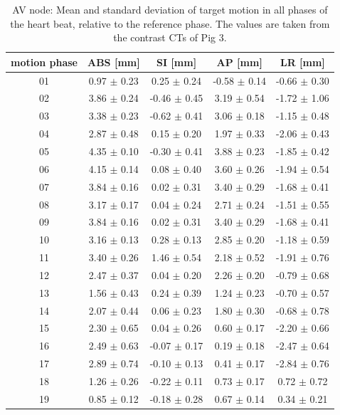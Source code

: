 \documentclass[type=dr, dr=rernat, accentcolor=tud7b,colorbacktitle, bigchapter, openright, twoside, 12pt ]{tudthesis}
\begin{document}
\newpage

\begin{table}[htbp]
  \centering
  \caption{AV node: Mean and standard deviation of target motion in all phases of the heart beat, relative to the reference phase. The values are 
  taken from the contrast CTs of Pig 3.}
  \begin{tabular}{|c|c|c|c|c|}
    \hline\hline
    motion phase\rule{0pt}{2.6ex}\rule[-1.2ex]{0pt}{0pt} & ABS [mm] & SI [mm] & AP [mm] & LR [mm]\\
    \hline
01 &0.97 $\pm$ 0.23 &0.25 $\pm$ 0.24 &-0.58 $\pm$ 0.14 &-0.66 $\pm$ 0.30 \\
02 &3.86 $\pm$ 0.24 &-0.46 $\pm$ 0.45 &3.19 $\pm$ 0.54 &-1.72 $\pm$ 1.06 \\
03 &3.38 $\pm$ 0.23 &-0.62 $\pm$ 0.41 &3.06 $\pm$ 0.18 &-1.15 $\pm$ 0.48 \\
04 &2.87 $\pm$ 0.48 &0.15 $\pm$ 0.20 &1.97 $\pm$ 0.33 &-2.06 $\pm$ 0.43 \\
05 &4.35 $\pm$ 0.10 &-0.30 $\pm$ 0.41 &3.88 $\pm$ 0.23 &-1.85 $\pm$ 0.42 \\
06 &4.15 $\pm$ 0.14 &0.08 $\pm$ 0.40 &3.60 $\pm$ 0.26 &-1.94 $\pm$ 0.54 \\
07 &3.84 $\pm$ 0.16 &0.02 $\pm$ 0.31 &3.40 $\pm$ 0.29 &-1.68 $\pm$ 0.41 \\
08 &3.17 $\pm$ 0.17 &0.04 $\pm$ 0.24 &2.71 $\pm$ 0.24 &-1.51 $\pm$ 0.55 \\
09 &3.84 $\pm$ 0.16 &0.02 $\pm$ 0.31 &3.40 $\pm$ 0.29 &-1.68 $\pm$ 0.41 \\
10 &3.16 $\pm$ 0.13 &0.28 $\pm$ 0.13 &2.85 $\pm$ 0.20 &-1.18 $\pm$ 0.59 \\
11 &3.40 $\pm$ 0.26 &1.46 $\pm$ 0.54 &2.18 $\pm$ 0.52 &-1.91 $\pm$ 0.76 \\
12 &2.47 $\pm$ 0.37 &0.04 $\pm$ 0.20 &2.26 $\pm$ 0.20 &-0.79 $\pm$ 0.68 \\
13 &1.56 $\pm$ 0.43 &0.24 $\pm$ 0.39 &1.24 $\pm$ 0.23 &-0.70 $\pm$ 0.57 \\
14 &2.07 $\pm$ 0.44 &0.06 $\pm$ 0.23 &1.80 $\pm$ 0.30 &-0.68 $\pm$ 0.78 \\
15 &2.30 $\pm$ 0.65 &0.04 $\pm$ 0.26 &0.60 $\pm$ 0.17 &-2.20 $\pm$ 0.66 \\
16 &2.49 $\pm$ 0.63 &-0.07 $\pm$ 0.17 &0.19 $\pm$ 0.18 &-2.47 $\pm$ 0.64 \\
17 &2.89 $\pm$ 0.74 &-0.10 $\pm$ 0.13 &0.41 $\pm$ 0.17 &-2.84 $\pm$ 0.76 \\
18 &1.26 $\pm$ 0.26 &-0.22 $\pm$ 0.11 &0.73 $\pm$ 0.17 &0.72 $\pm$ 0.72 \\
19 &0.85 $\pm$ 0.12 &-0.18 $\pm$ 0.28 &0.67 $\pm$ 0.14 &0.34 $\pm$ 0.21 \\
    \hline\hline
  \end{tabular}
  \label{tab:motion:AV:Pig3}
\end{table}
\end{document}
